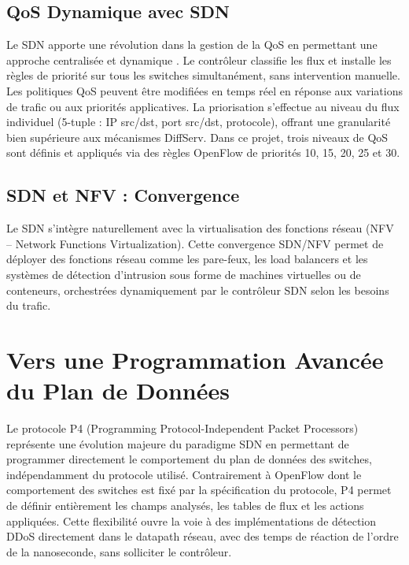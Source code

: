 \documentclass[12pt,a4paper]{report}
\begin{document}
\subsection{QoS Dynamique avec SDN}
Le SDN apporte une révolution dans la gestion de la QoS
en permettant une approche centralisée et dynamique
\cite{liu2022qos}. Le contrôleur classifie les flux et
installe les règles de priorité sur tous les switches
simultanément, sans intervention manuelle. Les politiques
QoS peuvent être modifiées en temps réel en réponse aux
variations de trafic ou aux priorités applicatives. La
priorisation s'effectue au niveau du flux individuel
(5-tuple : IP src/dst, port src/dst, protocole), offrant
une granularité bien supérieure aux mécanismes DiffServ.
Dans ce projet, trois niveaux de QoS sont définis et
appliqués via des règles OpenFlow de priorités 10, 15,
20, 25 et 30.

\subsection{SDN et NFV : Convergence}
Le SDN s'intègre naturellement avec la virtualisation
des fonctions réseau (NFV -- Network Functions
Virtualization). Cette convergence SDN/NFV permet de
déployer des fonctions réseau comme les pare-feux, les
load balancers et les systèmes de détection d'intrusion
sous forme de machines virtuelles ou de conteneurs,
orchestrées dynamiquement par le contrôleur SDN selon
les besoins du trafic.

\section{Vers une Programmation Avancée du Plan de Données}
Le protocole P4 (Programming Protocol-Independent Packet
Processors) \cite{bosshart2014p4} représente une évolution
majeure du paradigme SDN en permettant de programmer
directement le comportement du plan de données des
switches, indépendamment du protocole utilisé. Contrairement
à OpenFlow dont le comportement des switches est fixé par
la spécification du protocole, P4 permet de définir
entièrement les champs analysés, les tables de flux et
les actions appliquées. Cette flexibilité ouvre la voie
à des implémentations de détection DDoS directement
dans le datapath réseau, avec des temps de réaction de
l'ordre de la nanoseconde, sans solliciter le contrôleur.
\end{document}
